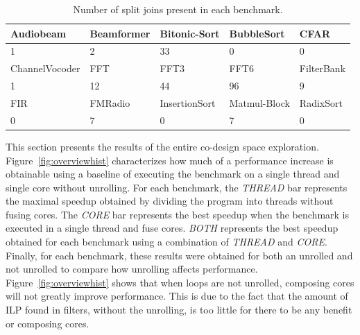 \begin{table}[!htb]
  \small
 \begin{tabular} { | l | l | l | l | l | }
 \hline
   \cellcolor[gray]{0.7}Audiobeam&  \cellcolor[gray]{0.7} Beamformer& \cellcolor[gray]{0.7}Bitonic-Sort  &  \cellcolor[gray]{0.7} BubbleSort &  \cellcolor[gray]{0.7}  CFAR\\ \hline
  1 & 2 & 33 & 0 & 0 \\ \hline
   \cellcolor[gray]{0.7}ChannelVocoder &  \cellcolor[gray]{0.7} FFT&  \cellcolor[gray]{0.7}FFT3 &  \cellcolor[gray]{0.7} FFT6&  \cellcolor[gray]{0.7}FilterBank \\ \hline
  1 & 12 & 44 & 96 & 9 \\ \hline 
   \cellcolor[gray]{0.7}FIR &  \cellcolor[gray]{0.7} FMRadio &  \cellcolor[gray]{0.7} InsertionSort &  \cellcolor[gray]{0.7} Matmul-Block &  \cellcolor[gray]{0.7} RadixSort\\ \hline
  0 & 7 & 0 & 7 & 0 \\ \hline
 \end{tabular}
  \caption{Number of split joins present in each benchmark.}\label{tab:splitjoin}
\end{table}

This section  presents the results of the entire co-design space exploration.
Figure~\ref{fig:overviewhist} characterizes how much of a performance increase is obtainable using a baseline of executing the benchmark on a single thread and single core without unrolling.
For each benchmark, the \textit{THREAD} bar represents the maximal speedup obtained by dividing the program into threads without fusing cores.
The \textit{CORE} bar represents the best speedup when the benchmark is executed in a single thread and fuse cores.
\textit{BOTH} represents the best speedup obtained for each benchmark using a combination of \textit{THREAD} and \textit{CORE}.
Finally, for each benchmark, these results were obtained for both an unrolled and not unrolled to compare how unrolling affects performance.
Figure~\ref{fig:overviewhist} shows that when loops are not unrolled, composing cores will not greatly improve performance.
This is due to the fact that the amount of ILP found in filters, without the unrolling, is too little for there to be any benefit or composing cores.


